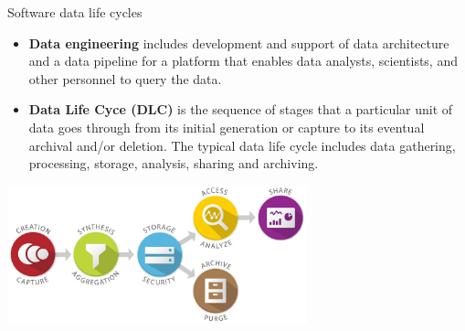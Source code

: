\begin{frame}{Software data life cycles}%
    \begin{itemize}
        \item \textbf{Data engineering} includes development and support of data architecture and a data pipeline for a platform that enables data analysts, scientists, and other personnel to query the data.
        
        \item \textbf{Data Life Cyce (DLC)} is the sequence of stages that a particular unit of data goes through from its initial generation 
        or capture to its eventual archival and/or deletion. The typical data life cycle includes data gathering, processing, storage, analysis, sharing and archiving. 

    \end{itemize}
    \vspace{-1ex}
    \centering
    \includegraphics[width=0.65\textwidth]{pics/data_lifecycle_illust.jpg}
\end{frame}

